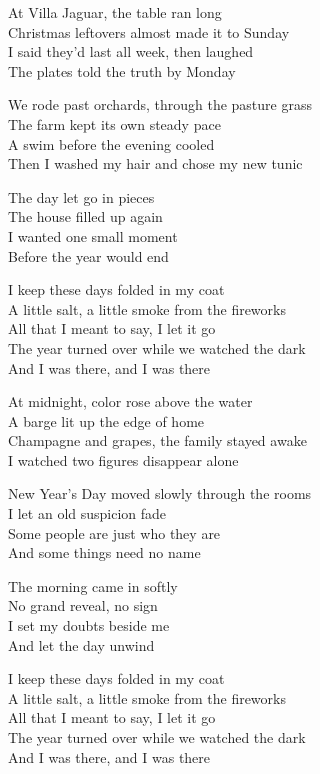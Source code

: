 \begin{lyrics}
At Villa Jaguar, the table ran long\\
Christmas leftovers almost made it to Sunday\\
I said they’d last all week, then laughed\\
The plates told the truth by Monday

We rode past orchards, through the pasture grass\\
The farm kept its own steady pace\\
A swim before the evening cooled\\
Then I washed my hair and chose my new tunic

The day let go in pieces\\
The house filled up again\\
I wanted one small moment\\
Before the year would end

I keep these days folded in my coat\\
A little salt, a little smoke from the fireworks\\
All that I meant to say, I let it go\\
The year turned over while we watched the dark\\
And I was there, and I was there

At midnight, color rose above the water\\
A barge lit up the edge of home\\
Champagne and grapes, the family stayed awake\\
I watched two figures disappear alone

New Year’s Day moved slowly through the rooms\\
I let an old suspicion fade\\
Some people are just who they are\\
And some things need no name

The morning came in softly\\
No grand reveal, no sign\\
I set my doubts beside me\\
And let the day unwind

I keep these days folded in my coat\\
A little salt, a little smoke from the fireworks\\
All that I meant to say, I let it go\\
The year turned over while we watched the dark\\
And I was there, and I was there


\end{lyrics}
